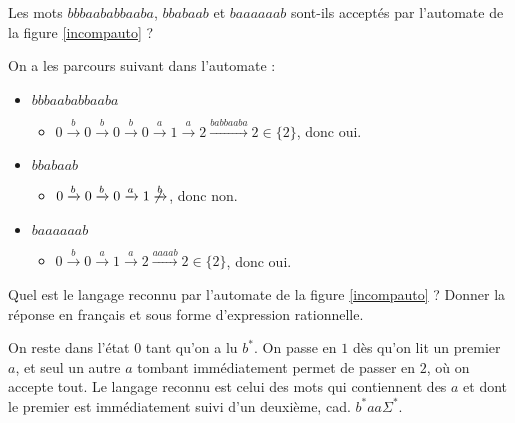 \begin{exercice}
Les mots $bbbaababbaaba$, $bbabaab$ et $baaaaaab$ sont-ils acceptés par l'automate de la figure \ref{incompauto} ?
\end{exercice}


\begin{correction*}
On a les parcours suivant dans l'automate :
\begin{itemize}

\item $bbbaababbaaba$
\begin{itemize}
\item[] $0 \xrightarrow{b} 0 \xrightarrow{b} 0 \xrightarrow{b} 0 \xrightarrow{a} 1 \xrightarrow{a} 2 \xrightarrow{babbaaba} 2 \in \{2\}$, donc oui.
\end{itemize}

\item $bbabaab$
\begin{itemize}
\item[] $0 \xrightarrow{b} 0 \xrightarrow{b} 0 \xrightarrow{a} 1 \not\xrightarrow{b}$, donc non.
\end{itemize}

\item $baaaaaab$
\begin{itemize}
\item[] $0 \xrightarrow{b} 0 \xrightarrow{a} 1 \xrightarrow{a} 2 \xrightarrow{aaaab} 2 \in \{2\}$, donc oui.
\end{itemize}

\end{itemize}
\end{correction*}

\begin{exercice}
Quel est le langage reconnu par l'automate de la figure \ref{incompauto} ? Donner la réponse en français et sous forme d'expression rationnelle.
\end{exercice}

\begin{correction*}
On reste dans l'état $0$ tant qu'on a lu $b^*$. On passe en $1$ dès qu'on lit un premier $a$, et seul un autre $a$ tombant immédiatement permet de passer en $2$, où on accepte tout. Le langage reconnu est celui des mots qui contiennent des $a$ et dont le premier est immédiatement suivi d'un deuxième, cad. $b^*aa\Sigma^*$. 
\end{correction*}

